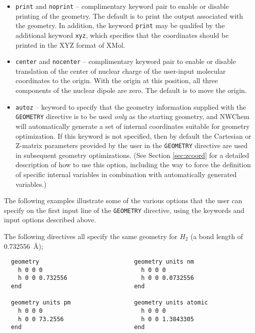 \begin{itemize}
\item \verb+print+ and \verb+noprint+ -- complimentary keyword pair to
enable or disable printing of the geometry.  The default is to print   
the output associated with the geometry.  In addition, the keyword 
\verb+print+ may
be qualifed by the additional keyword \verb+xyz+, which specifies
that the coordinates should be printed in the XYZ format of XMol.

\item \verb+center+ and \verb+nocenter+ -- complimentary keyword pair
  to enable or disable translation of the center of nuclear charge of
  the user-input molecular coordinates to the origin.  With the
  origin at this position, all three components of the nuclear dipole
  are zero.  The default is to move the origin.

\item \verb+autoz+ -- keyword to specify that the geometry 
information supplied
with the \verb+GEOMETRY+ directive is to be used {\em only} as the starting
geometry, and NWChem will automatically generate a set of internal coordinates
suitable for geometry optimization.  If this keyword is not specified, then
by default the Cartesian or Z-matrix parameters provided by the user
in the \verb+GEOMETRY+ directive are used in subsequent geometry
optimizations. 
(See Section \ref{sec:zcoord} for a detailed description of how to
use this option, including the way to
force the definition of specific internal variables in combination
with automatically generated variables.)
\end{itemize}

The following examples illustrate some of the various options that the user
can specify on the first input line of the \verb+GEOMETRY+ directive, using
the keywords and input options described above.

The following directives all specify the same geometry for $H_2$
(a bond length of 0.732556\ \AA);
\begin{verbatim}
  geometry                           geometry units nm    
    h 0 0 0                            h 0 0 0            
    h 0 0 0.732556                     h 0 0 0.0732556    
  end                                end                  

  geometry units pm                  geometry units atomic 
    h 0 0 0                            h 0 0 0             
    h 0 0 73.2556                      h 0 0 1.3843305     
  end                                end                   
\end{verbatim}
      
